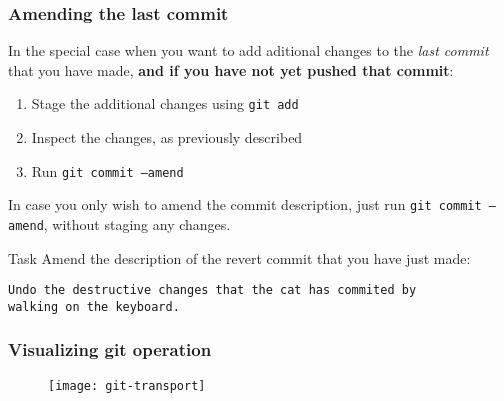 
\begin{frame}[fragile]

\frametitle{Amending the last commit}

In the special case when you want to add aditional changes to the \textit{last commit} that you have made, \textbf{and if you have not yet pushed that commit}:

	\begin{enumerate}
	\item Stage the additional changes using \texttt{git add}
	\item Inspect the changes, as previously described
	\item Run \texttt{git commit --amend}
	\end{enumerate}

In case you only wish to amend the commit description, just run \texttt{git commit --amend}, without staging any changes.

	\begin{block}{Task}
	Amend the description of the revert commit that you have just made:
	\begin{verbatim}
Undo the destructive changes that the cat has commited by
walking on the keyboard.
	\end{verbatim}
\end{block}

\end{frame}




\begin{frame}[fragile]
	\frametitle{Visualizing git operation}
	
	\begin{figure}
		\texttt{[image: git-transport]}
	\end{figure}
\end{frame}


